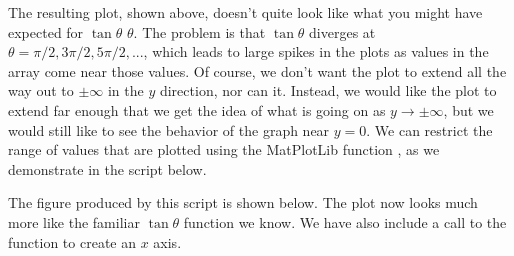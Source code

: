 \documentclass[letterpaper,10pt,english]{sphinxmanual}
\begin{document}
\sphinxAtStartPar
The resulting plot, shown above, doesn’t quite look like what you might have expected for \(\tan\theta\)  \(\theta\).  The problem is that \(\tan\theta\) diverges at \(\theta = \pi/2, 3\pi/2, 5\pi/2, ...\), which leads to large spikes in the plots as values in the  array come near those values.  Of course, we don’t want the plot to extend all the way out to \(\pm\infty\) in the \(y\) direction, nor can it.  Instead, we would like the plot to extend far enough that we get the idea of what is going on as \(y\rightarrow\pm\infty\), but we would still like to see the behavior of the graph near \(y=0\).  We can restrict the range of  values that are plotted using the MatPlotLib function , as we demonstrate in the script below.

\begin{sphinxVerbatim}[commandchars=\\\{\},numbers=left,firstnumber=1,stepnumber=1]
   
   

    
  

 
          
 

\end{sphinxVerbatim}

\sphinxAtStartPar
The figure produced by this script is shown below.  The plot now looks much more like the familiar \(\tan\theta\) function we know.  We have also include a call to the  function to create an \(x\) axis.
\end{document}
